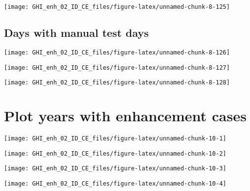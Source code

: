\documentclass[
  10pt,
  a4paper,oneside]{article}
\begin{document}
\begin{center}\texttt{[image: GHI\_enh\_02\_ID\_CE\_files/figure-latex/unnamed-chunk-8-125]} \end{center}

\FloatBarrier

\hypertarget{days-with-manual-test-days}{%
\subsection{Days with manual test days}\label{days-with-manual-test-days}}

\begin{center}\texttt{[image: GHI\_enh\_02\_ID\_CE\_files/figure-latex/unnamed-chunk-8-126]} \end{center}

\begin{center}\texttt{[image: GHI\_enh\_02\_ID\_CE\_files/figure-latex/unnamed-chunk-8-127]} \end{center}

\begin{center}\texttt{[image: GHI\_enh\_02\_ID\_CE\_files/figure-latex/unnamed-chunk-8-128]} \end{center}

\newpage
\FloatBarrier

\hypertarget{plot-years-with-enhancement-cases}{%
\section{Plot years with enhancement cases}\label{plot-years-with-enhancement-cases}}

\begin{center}\texttt{[image: GHI\_enh\_02\_ID\_CE\_files/figure-latex/unnamed-chunk-10-1]} \end{center}

\begin{center}\texttt{[image: GHI\_enh\_02\_ID\_CE\_files/figure-latex/unnamed-chunk-10-2]} \end{center}

\begin{center}\texttt{[image: GHI\_enh\_02\_ID\_CE\_files/figure-latex/unnamed-chunk-10-3]} \end{center}

\begin{center}\texttt{[image: GHI\_enh\_02\_ID\_CE\_files/figure-latex/unnamed-chunk-10-4]} \end{center}
\end{document}
